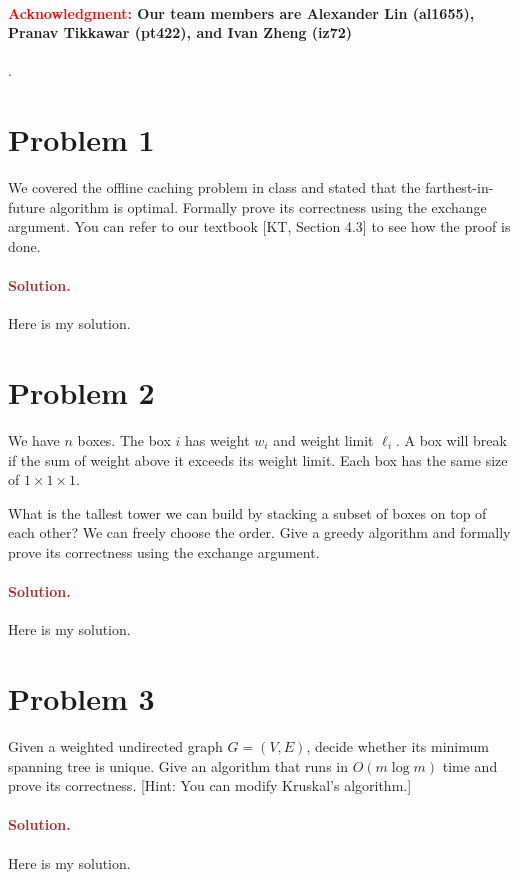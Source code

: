 \paragraph{\textcolor{red}{Acknowledgment:} Our team members are \textbf{Alexander Lin (al1655)}, \textbf{Pranav Tikkawar (pt422)}, and \textbf{Ivan Zheng (iz72)}}.


\section*{Problem 1}
We covered the offline caching problem in class and stated that the farthest-in-future algorithm is optimal. Formally prove its correctness using the exchange argument. You can refer to our textbook [KT, Section 4.3] to see how the proof is done.

\paragraph{\textcolor{brown}{Solution.}}
Here is my solution.


\section*{Problem 2}
We have $n$ boxes. The box $i$ has weight $w_i$ and weight limit $\ell_i$. A box will break if the sum of weight above it exceeds its weight limit. Each box has the same size of $1 \times 1 \times 1$.

What is the tallest tower we can build by stacking a subset of boxes on top of each other? We can freely choose the order. Give a greedy algorithm and formally prove its correctness using the exchange argument.

\paragraph{\textcolor{brown}{Solution.}}
Here is my solution.


\section*{Problem 3}
Given a weighted undirected graph $G = (V, E)$, decide whether its minimum spanning tree is unique. Give an algorithm that runs in $O(m \log m)$ time and prove its correctness. [Hint: You can modify Kruskal's algorithm.]


\paragraph{\textcolor{brown}{Solution.}}
Here is my solution.


